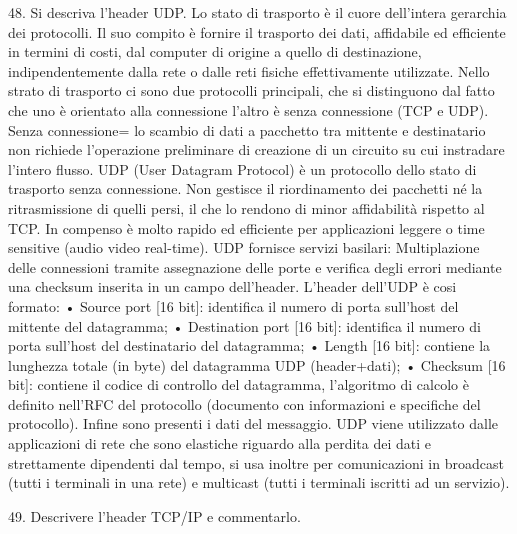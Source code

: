 48.	Si descriva l’header UDP.
Lo stato di trasporto è il cuore dell’intera gerarchia dei protocolli. Il suo compito è fornire il trasporto dei dati, affidabile ed efficiente in termini di costi, dal computer di origine a quello di destinazione, indipendentemente dalla rete o dalle reti fisiche effettivamente utilizzate.
Nello strato di trasporto ci sono due protocolli principali, che si distinguono dal fatto che uno è orientato alla connessione l’altro è senza connessione (TCP e UDP).
Senza connessione= lo scambio di dati a pacchetto tra mittente e destinatario non richiede l’operazione preliminare di creazione di un circuito su cui instradare l’intero flusso.
UDP (User Datagram Protocol) è un protocollo dello stato di trasporto senza connessione. Non gestisce il riordinamento dei pacchetti né la ritrasmissione di quelli persi, il che lo rendono di minor affidabilità rispetto al TCP. In compenso è molto rapido ed efficiente per applicazioni leggere o time sensitive (audio video real-time).
UDP fornisce servizi basilari: Multiplazione delle connessioni tramite assegnazione delle porte e verifica degli errori mediante una checksum inserita in un campo dell’header.
L’header dell’UDP è cosi formato:
•	Source port [16 bit]: identifica il numero di porta sull’host del mittente del datagramma;
•	Destination port [16 bit]: identifica il numero di porta sull’host del destinatario del datagramma;
•	Length [16 bit]: contiene la lunghezza totale (in byte) del datagramma UDP (header+dati);
•	Checksum [16 bit]: contiene il codice di controllo del datagramma, l’algoritmo di calcolo è definito nell’RFC del protocollo (documento con informazioni e specifiche del protocollo).
Infine sono presenti i dati del messaggio.
UDP viene utilizzato dalle applicazioni di rete che sono elastiche riguardo alla perdita dei dati e strettamente dipendenti dal tempo, si usa inoltre per comunicazioni in broadcast (tutti i terminali in una rete) e multicast (tutti i terminali iscritti ad un servizio).
 

49.	Descrivere l’header TCP/IP e commentarlo.

